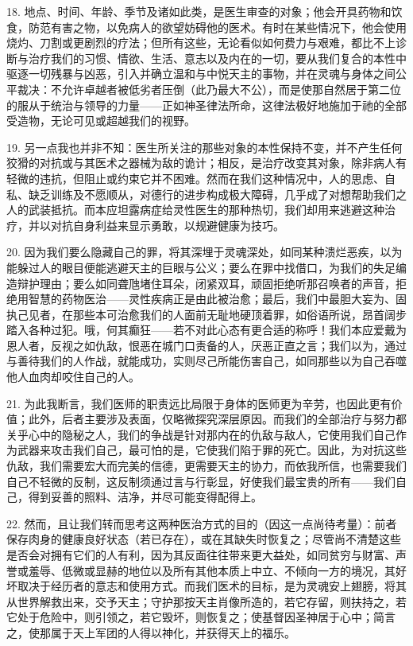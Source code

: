 18. 地点、时间、年龄、季节及诸如此类，是医生审查的对象；他会开具药物和饮食，防范有害之物，以免病人的欲望妨碍他的医术。有时在某些情况下，他会使用烧灼、刀割或更剧烈的疗法；但所有这些，无论看似如何费力与艰难，都比不上诊断与治疗我们的习惯、情欲、生活、意志以及内在的一切，要从我们复合的本性中驱逐一切残暴与凶恶，引入并确立温和与中悦天主的事物，并在灵魂与身体之间公平裁决：不允许卓越者被低劣者压倒（此乃最大不公），而是使那自然居于第二位的服从于统治与领导的力量——正如神圣律法所命，这律法极好地施加于祂的全部受造物，无论可见或超越我们的视野。\par

19. 另一点我也并非不知：医生所关注的那些对象的本性保持不变，并不产生任何狡猾的对抗或与其医术之器械为敌的诡计；相反，是治疗改变其对象，除非病人有轻微的违抗，但阻止或约束它并不困难。然而在我们这种情况中，人的思虑、自私、缺乏训练及不愿顺从，对德行的进步构成极大障碍，几乎成了对想帮助我们之人的武装抵抗。而本应坦露病症给灵性医生的那种热切，我们却用来逃避这种治疗，并以对抗自身利益来显示勇敢，以规避健康为技巧。\par

20. 因为我们要么隐藏自己的罪，将其深埋于灵魂深处，如同某种溃烂恶疾，以为能躲过人的眼目便能逃避天主的巨眼与公义；要么在罪中找借口，为我们的失足编造辩护理由；要么如同聋虺堵住耳朵，闭紧双耳，顽固拒绝听那召唤者的声音，拒绝用智慧的药物医治——灵性疾病正是由此被治愈；最后，我们中最胆大妄为、固执己见者，在那些本可治愈我们的人面前无耻地硬顶着罪，如俗语所说，昂首阔步踏入各种过犯。哦，何其癫狂——若不对此心态有更合适的称呼！我们本应爱戴为恩人者，反视之如仇敌，恨恶在城门口责备的人，厌恶正直之言；我们以为，通过与善待我们的人作战，就能成功，实则尽己所能伤害自己，如同那些以为自己吞噬他人血肉却咬住自己的人。\par

21. 为此我断言，我们医师的职责远比局限于身体的医师更为辛劳，也因此更有价值；此外，后者主要涉及表面，仅略微探究深层原因。而我们的全部治疗与努力都关乎心中的隐秘之人，我们的争战是针对那内在的仇敌与敌人，它使用我们自己作为武器来攻击我们自己，最可怕的是，它使我们陷于罪的死亡。因此，为对抗这些仇敌，我们需要宏大而完美的信德，更需要天主的协力，而依我所信，也需要我们自己不轻微的反制，这反制须通过言与行彰显，好使我们最宝贵的所有——我们自己，得到妥善的照料、洁净，并尽可能变得配得上。\par

22. 然而，且让我们转而思考这两种医治方式的目的（因这一点尚待考量）：前者保存肉身的健康良好状态（若已存在），或在其缺失时恢复之；尽管尚不清楚这些是否会对拥有它们的人有利，因为其反面往往带来更大益处，如同贫穷与财富、声誉或羞辱、低微或显赫的地位以及所有其他本质上中立、不倾向一方的境况，其好坏取决于经历者的意志和使用方式。而我们医术的目标，是为灵魂安上翅膀，将其从世界解救出来，交予天主；守护那按天主肖像所造的，若它存留，则扶持之，若它处于危险中，则引领之，若它毁坏，则恢复之；使基督因圣神居于心中；简言之，使那属于天上军团的人得以神化，并获得天上的福乐。\par

